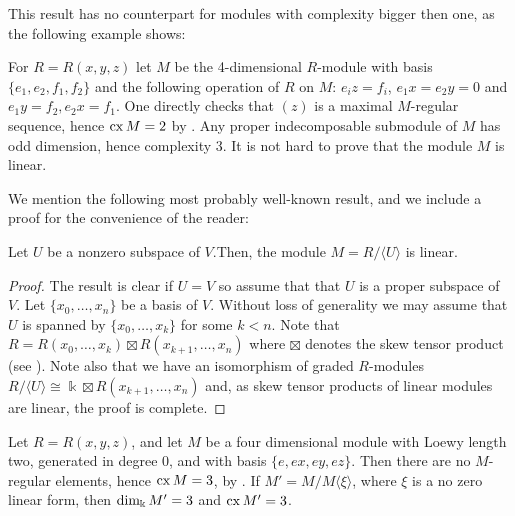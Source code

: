 \documentclass[10pt]{amsart}
\begin{document}
\noindent This result has no counterpart for modules with complexity bigger then one, as the following
example shows:

\begin{Example}
For $R=R(x,y,z)$ let $M$ be the 4-dimensional $R$-module with basis $\{ e_1,e_2,f_1,f_2\}$ and the
following operation of $R$ on $M$:  $e_iz = f_i$, $e_1x = e_2y =0$ and $e_1y =f_2, e_2x = f_1$.
One directly checks that $(z)$ is a maximal $M$-regular sequence, hence $ \operatorname{cx}\nolimits M =2$ by \cite{AAH}.  Any proper
indecomposable submodule of $M$ has odd dimension, hence complexity 3. It is not hard to prove
that the module $M$ is linear.
\end{Example}

\medskip
\noindent We mention the following most probably well-known result, and we include a proof for the convenience of the reader:

\begin{lemma}  Let $U$ be a nonzero subspace of $V$.Then, the module $M=R/{\langle U\rangle}$ is linear.
\end{lemma}
\begin{proof} The result is clear if $U=V$ so assume that that $U$ is a proper subspace of $V$. Let $\{x_0,\ldots ,x_n\}$ be a basis of $V$. Without loss of generality we may assume that $U$ is spanned by $\{x_0,\ldots ,x_k\}$ for some $k<n$. Note that $R=R(x_0,\ldots ,x_k)\boxtimes R(x_{k+1},\ldots,x_n)$ where $\boxtimes$ denotes the skew tensor product (see \cite{PP,MVZ2}). Note also that we have an isomorphism of graded $R$-modules $R/{\langle U\rangle}\cong\Bbbk\boxtimes R(x_{k+1},\ldots,x_n)$ and, as skew tensor products of linear modules are linear, the proof is complete.   
\end{proof}


\medskip
\begin{Example}\label{complexity example}

\noindent   Let $R = R(x,y,z)$, and let $M$ be a four dimensional module with Loewy length two, generated in degree $0$, and with
basis $\{e,ex,ey,ez\}$. Then there are no $M$-regular elements, hence $\operatorname{cx}\nolimits M = 3$, by \cite{AAH}.
If $M' = M/ M\langle\xi\rangle$,  where $\xi$ is a no zero linear form, then $\operatorname{dim}\nolimits_{\Bbbk}M' = 3$ and $\operatorname{cx}\nolimits M' = 3$.
\end{Example}
\medskip
\end{document}
